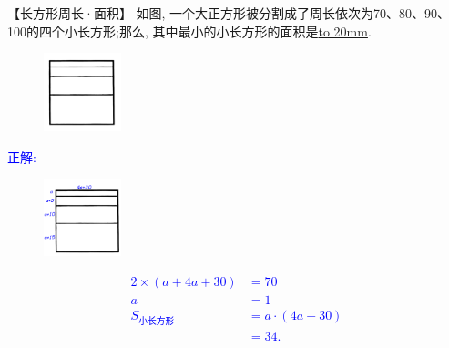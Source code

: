 \item {
    【长方形周长·面积】
    如图, 一个大正方形被分割成了周长依次为70、80、90、100的四个小长方形;那么, 其中最小的小长方形的面积是\underline{\hbox to 20mm{}}.
    \begin{figure}[H] 
        \centering
        \includegraphics[width=0.2\textwidth]{./pics/Chapter_2/4.png}
    \end{figure}
    \ifshowSolution 
        \fangsong{}\textcolor{blue}{
            正解: \\
            \begin{figure}[H] 
                \centering
                \includegraphics[width=0.2\textwidth]{./pics/Chapter_2/seikai_4.png}
            \end{figure}
            \begin{align*}
                2\times (a+4a+30) &= 70 \\
                a &= 1 \\
                S_{小长方形} &= a\cdot (4a+30)\\
                &= 34.
            \end{align*}
        }
    \else
        \vspace{1cm}
    \fi
}

